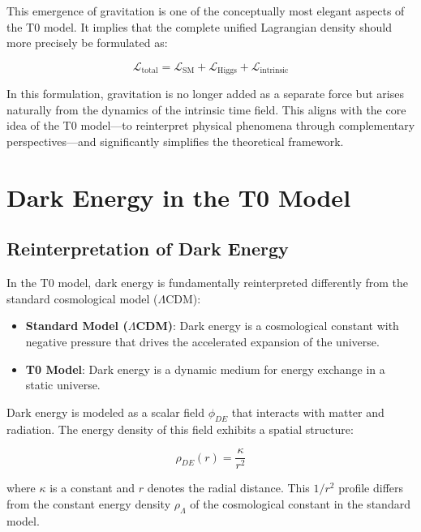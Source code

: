 \documentclass[a4paper,12pt]{article}
\theoremstyle{definition}
\theoremstyle{remark}
\begin{document}
	This emergence of gravitation is one of the conceptually most elegant aspects of the T0 model. It implies that the complete unified Lagrangian density should more precisely be formulated as:
	
	\begin{equation}
		\mathcal{L}_\text{total} = \mathcal{L}_\text{SM} + \mathcal{L}_\text{Higgs} + \mathcal{L}_\text{intrinsic}
	\end{equation}
	
	In this formulation, gravitation is no longer added as a separate force but arises naturally from the dynamics of the intrinsic time field. This aligns with the core idea of the T0 model—to reinterpret physical phenomena through complementary perspectives—and significantly simplifies the theoretical framework.
	
	\section{Dark Energy in the T0 Model}
	
	\subsection{Reinterpretation of Dark Energy}
	
	In the T0 model, dark energy is fundamentally reinterpreted differently from the standard cosmological model ($\Lambda$CDM):
	
	\begin{itemize}
		\item \textbf{Standard Model ($\Lambda$CDM)}: Dark energy is a cosmological constant with negative pressure that drives the accelerated expansion of the universe.
		\item \textbf{T0 Model}: Dark energy is a dynamic medium for energy exchange in a static universe.
	\end{itemize}
	
	Dark energy is modeled as a scalar field $\phi_{DE}$ that interacts with matter and radiation. The energy density of this field exhibits a spatial structure:
	
	\begin{equation}
		\rho_{DE}(r) = \frac{\kappa}{r^2}
	\end{equation}
	
	where $\kappa$ is a constant and $r$ denotes the radial distance. This $1/r^2$ profile differs from the constant energy density $\rho_\Lambda$ of the cosmological constant in the standard model.
	
\end{document}
